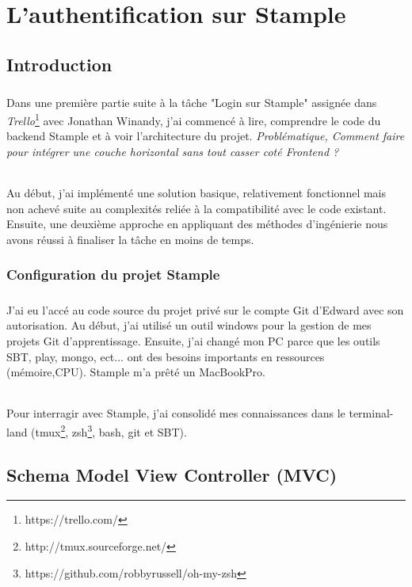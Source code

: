 \chapter{L'authentification sur Stample}
\section*{}
\section{Introduction}
\paragraph{}
Dans une première partie suite à la tâche "Login sur Stample" assignée dans \textit{Trello}\footnote{https://trello.com/} avec Jonathan Winandy, j'ai commencé à lire, comprendre le code du backend Stample et à voir l'architecture du projet. 
\newline
\textit{Problématique, Comment faire pour intégrer une couche horizontal sans tout casser coté Frontend ?}
\subparagraph{}
Au début, j'ai implémenté une solution basique, relativement fonctionnel mais non achevé suite au complexités reliée à la compatibilité avec le code existant.
Ensuite, une deuxième approche en appliquant des méthodes d'ingénierie nous avons réussi à finaliser la tâche en moins de temps.

\subsection{Configuration du projet Stample}
\paragraph{}
J'ai eu l'accé au code source du projet privé sur le compte Git d'Edward avec son autorisation.
Au début, j'ai utilisé un outil windows pour la gestion de mes projets Git d'apprentissage.
Ensuite, j'ai changé mon PC parce que les outils SBT, play, mongo, ect... ont des besoins importants en ressources (mémoire,CPU). Stample m'a prêté un MacBookPro. 
\subparagraph{}
Pour interragir avec Stample, j'ai consolidé mes connaissances dans le terminal-land (tmux\footnote{http://tmux.sourceforge.net/}, zsh\footnote{https://github.com/robbyrussell/oh-my-zsh}, bash, git et SBT).
\section{Schema Model View Controller (MVC)}
